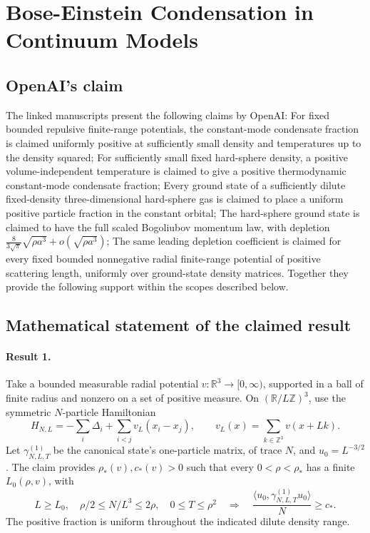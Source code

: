 \documentclass[11pt]{article}
\begin{document}
\section*{Bose-Einstein Condensation in Continuum Models}

\subsection{OpenAI's claim}
The linked manuscripts present the following claims by OpenAI: For fixed bounded repulsive finite-range potentials, the constant-mode condensate fraction is claimed uniformly positive at sufficiently small density and temperatures up to the density squared; For sufficiently small fixed hard-sphere density, a positive volume-independent temperature is claimed to give a positive thermodynamic constant-mode condensate fraction; Every ground state of a sufficiently dilute fixed-density three-dimensional hard-sphere gas is claimed to place a uniform positive particle fraction in the constant orbital; The hard-sphere ground state is claimed to have the full scaled Bogoliubov momentum law, with depletion $\frac{8}{3\sqrt\pi}\sqrt{\rho a^3}+o(\sqrt{\rho a^3})$; The same leading depletion coefficient is claimed for every fixed bounded nonnegative radial finite-range potential of positive scattering length, uniformly over ground-state density matrices. Together they provide the following support within the scopes described below.

\subsection{Mathematical statement of the claimed result}
\paragraph{Result 1.} Take a bounded measurable radial potential \(v:\mathbb R^3\to[0,\infty)\), supported in a ball of finite radius and nonzero on a set of positive measure. On \((\mathbb R/L\mathbb Z)^3\), use the symmetric \(N\)-particle Hamiltonian
\[
 H_{N,L}=-\sum_i\Delta_i+\sum_{i<j}v_L(x_i-x_j),\qquad
 v_L(x)=\sum_{k\in\mathbb Z^3}v(x+Lk).
\]
Let \(\gamma^{(1)}_{N,L,T}\) be the canonical state's one-particle matrix, of trace \(N\), and \(u_0=L^{-3/2}\). The claim provides \(\rho_*(v),c_*(v)>0\) such that every \(0<\rho<\rho_*\) has a finite \(L_0(\rho,v)\), with
\[
 L\ge L_0,\quad\rho/2\le N/L^3\le2\rho,\quad0\le T\le\rho^2
 \quad\Longrightarrow\quad
 \frac{\langle u_0,\gamma^{(1)}_{N,L,T}u_0\rangle}{N}\ge c_*.
\]
The positive fraction is uniform throughout the indicated dilute density range.
\end{document}
